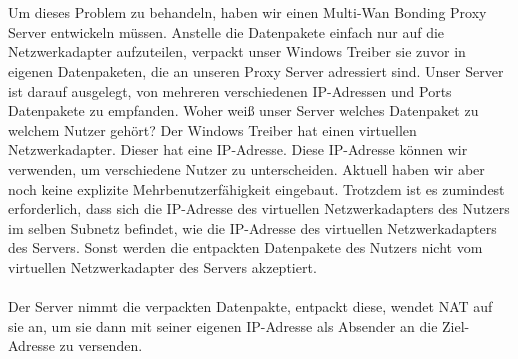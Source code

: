 \\\\
Um dieses Problem zu behandeln, haben wir einen Multi-Wan Bonding Proxy Server entwickeln müssen. Anstelle die Datenpakete einfach nur auf die Netzwerkadapter aufzuteilen, verpackt unser Windows Treiber sie zuvor in eigenen Datenpaketen, die an unseren Proxy Server adressiert sind. Unser Server ist darauf ausgelegt, von mehreren verschiedenen IP-Adressen und Ports Datenpakete zu empfanden. 
\newpage
\noindent
Woher weiß unser Server welches Datenpaket zu welchem Nutzer gehört? Der Windows Treiber hat einen virtuellen Netzwerkadapter. Dieser hat eine IP-Adresse. Diese IP-Adresse können wir verwenden, um verschiedene Nutzer zu unterscheiden. Aktuell haben wir aber noch keine explizite Mehrbenutzerfähigkeit eingebaut. Trotzdem ist es zumindest erforderlich, dass sich die IP-Adresse des virtuellen Netzwerkadapters des Nutzers im selben Subnetz befindet, wie die IP-Adresse des virtuellen Netzwerkadapters des Servers. Sonst werden die entpackten Datenpakete des Nutzers nicht vom virtuellen Netzwerkadapter des Servers akzeptiert.
\\\\
Der Server nimmt die verpackten Datenpakte, entpackt diese, wendet NAT auf sie an, um sie dann mit seiner eigenen IP-Adresse als Absender an die Ziel-Adresse zu versenden.

